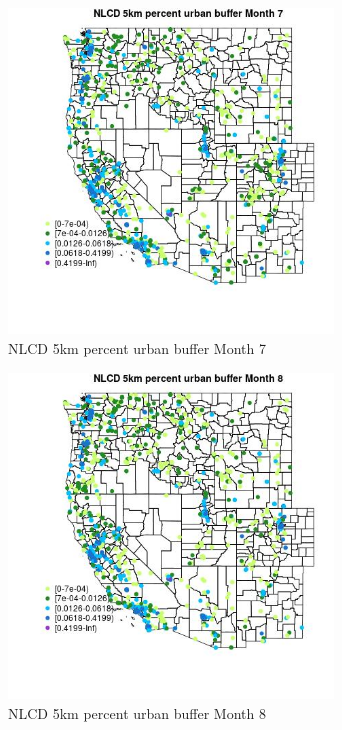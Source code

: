 \begin{figure} 
\centering  
\includegraphics[width=0.77\textwidth]{Code_Outputs/Report_ML_input_PM25_Step4_part_e_de_duplicated_aves_compiled_2019-05-21wNAs_MapObsMo7NLCD_5km_percent_urban_buffer.jpg} 
\caption{\label{fig:Report_ML_input_PM25_Step4_part_e_de_duplicated_aves_compiled_2019-05-21wNAsMapObsMo7NLCD_5km_percent_urban_buffer}NLCD 5km percent urban buffer Month 7} 
\end{figure} 
 

\begin{figure} 
\centering  
\includegraphics[width=0.77\textwidth]{Code_Outputs/Report_ML_input_PM25_Step4_part_e_de_duplicated_aves_compiled_2019-05-21wNAs_MapObsMo8NLCD_5km_percent_urban_buffer.jpg} 
\caption{\label{fig:Report_ML_input_PM25_Step4_part_e_de_duplicated_aves_compiled_2019-05-21wNAsMapObsMo8NLCD_5km_percent_urban_buffer}NLCD 5km percent urban buffer Month 8} 
\end{figure} 
 

